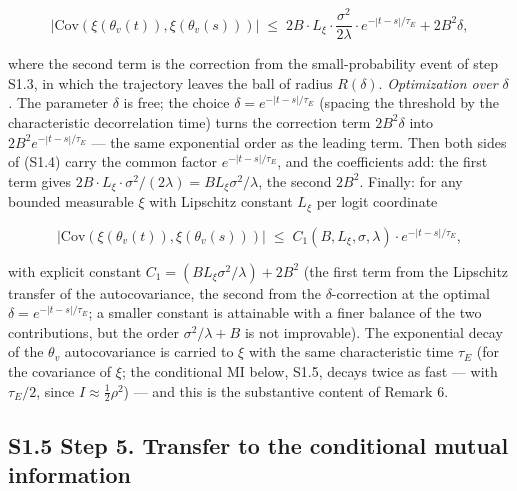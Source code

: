 \documentclass[pdflatex,sn-mathphys-ay]{sn-jnl}
\begin{document}
\begin{equation}\bigl|\text{Cov}(\xi(\theta_v(t)), \xi(\theta_v(s)))\bigr| \;\le\; 2 B \cdot L_\xi \cdot \frac{\sigma^2}{2\lambda} \cdot e^{-|t-s|/\tau_E} + 2B^2 \delta, \tag{S1.4}\end{equation}



where the second term is the correction from the small-probability event of step S1.3, in which the trajectory leaves the ball of radius \(R(\delta)\). \emph{Optimization over \(\delta\).} The parameter \(\delta\) is free; the choice \(\delta = e^{-|t-s|/\tau_E}\) (spacing the threshold by the characteristic decorrelation time) turns the correction term \(2B^2\delta\) into \(2B^2 e^{-|t-s|/\tau_E}\) --- the same exponential order as the leading term. Then both sides of (S1.4) carry the common factor \(e^{-|t-s|/\tau_E}\), and the coefficients add: the first term gives \(2B\cdot L_\xi\cdot\sigma^2/(2\lambda) = B L_\xi \sigma^2/\lambda\), the second \(2B^2\). Finally: for any bounded measurable \(\xi\) with Lipschitz constant \(L_\xi\) per logit coordinate



\begin{equation}\bigl|\text{Cov}(\xi(\theta_v(t)), \xi(\theta_v(s)))\bigr| \;\le\; C_1(B, L_\xi, \sigma, \lambda) \cdot e^{-|t-s|/\tau_E}, \tag{S1.4'}\end{equation}



with explicit constant \(C_1 = (B L_\xi \sigma^2/\lambda) + 2B^2\) (the first term from the Lipschitz transfer of the autocovariance, the second from the \(\delta\)-correction at the optimal \(\delta = e^{-|t-s|/\tau_E}\); a smaller constant is attainable with a finer balance of the two contributions, but the order \(\sigma^2/\lambda + B\) is not improvable). The exponential decay of the \(\theta_v\) autocovariance is carried to \(\xi\) with the same characteristic time \(\tau_E\) (for the covariance of \(\xi\); the conditional MI below, S1.5, decays twice as fast --- with \(\tau_E/2\), since \(I \approx \tfrac{1}{2}\rho^2\)) --- and this is the substantive content of Remark 6.



\subsection*{S1.5 Step 5. Transfer to the conditional mutual information}\label{s1.5-step-5.-transfer-to-the-conditional-mutual-information}
\end{document}
